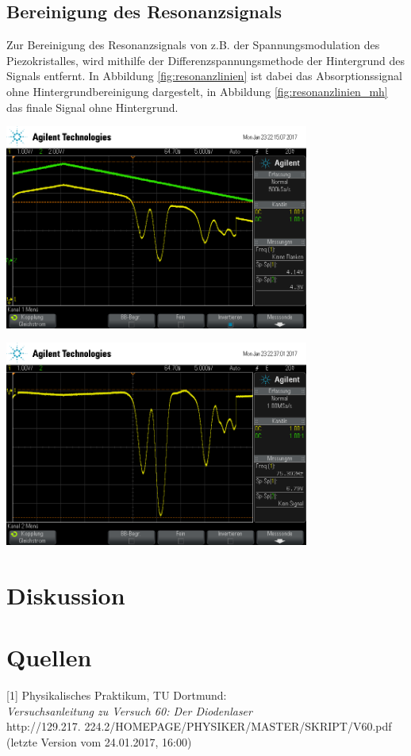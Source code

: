 \documentclass[captions=tableheading]{scrartcl}
\begin{document}
\subsection{Bereinigung des Resonanzsignals}
Zur Bereinigung des Resonanzsignals von z.B. der Spannungsmodulation des Piezokristalles, wird mithilfe der Differenzspannungsmethode der Hintergrund des Signals entfernt. In Abbildung \ref{fig:resonanzlinien} ist dabei das Absorptionssignal ohne Hintergrundbereinigung dargestelt, in Abbildung \ref{fig:resonanzlinien_mh} das finale Signal ohne Hintergrund.
\begin{center}
	\includegraphics[width=10cm]{images/resonanz.png}
	\label{fig:resonanzlinien}
\end{center}

\begin{center}
	\includegraphics[width=10cm]{images/resonanz_bereinigt.png}
	\label{fig:resonanzlinien_mh}
	\end{center}

\section{Diskussion}

\section{Quellen}
{[1]} Physikalisches Praktikum, TU Dortmund: \\
\textit{Versuchsanleitung zu Versuch 60: Der Diodenlaser} \\
http://129.217.
224.2/HOMEPAGE/PHYSIKER/MASTER/SKRIPT/V60.pdf (letzte Version vom 24.01.2017, 16:00)\\
\end{document}
